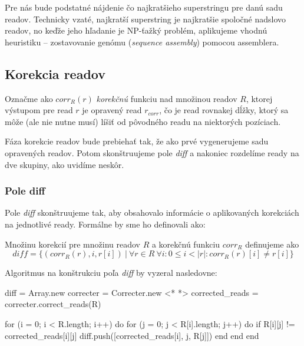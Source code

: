 Pre nás bude podstatné nájdenie čo najkratšieho superstringu pre danú sadu readov. Technicky vzaté, najkratší superstring je najkratšie spoločné nadslovo readov, no keďže jeho hľadanie je NP-ťažký problém, aplikujeme vhodnú heuristiku -- zostavovanie genómu (\emph{sequence assembly}) pomocou assemblera.

\subsection{Korekcia readov}
\begin{ozn}
Označme ako $corr_R(r)$ \emph{korekčnú} funkciu nad množinou readov $R$, ktorej výstupom pre read $r$ je opravený read $r_{corr}$, čo je read rovnakej dĺžky, ktorý sa môže (ale nie nutne musí) líšiť od pôvodného readu na niektorých pozíciach.
\end{ozn}

Fáza korekcie readov bude prebiehať tak, že ako prvé vygenerujeme sadu opravených readov. Potom skonštruujeme pole \emph{diff} a nakoniec rozdelíme ready na dve skupiny, ako uvidíme neskôr.

\subsubsection{Pole diff}
Pole \emph{diff} skonštruujeme tak, aby obsahovalo informácie o aplikovaných korekciách na jednotlivé ready. Formálne by sme ho definovali ako:

\begin{defn}
Množinu korekcií pre množinu readov $R$ a korekčnú funkciu $corr_R$ definujeme ako 
$$
diff = \{(corr_R(r), i, r[i])~|~\forall r \in R~\forall i : 0 \leq i < |r| : corr_R(r)[i] \neq r[i] \}
$$
\end{defn}

Algoritmus na konštrukciu poľa \emph{diff} by vyzeral nasledovne:

\bigskip
\begin{pseudocode}[label=lst:cr_index_diff_construction,caption={Algoritmus konštrukcie poľa diff.}]
diff = Array.new
correcter = Correcter.new <* \label{lst:cr_index_diff_construction_correcter} *>
corrected_reads = correcter.correct_reads(R)

for (i = 0; i < R.length; i++) do
  for (j = 0; j < R[i].length; j++) do
    if R[i][j] != corrected_reads[i][j]
      diff.push([corrected_reads[i], j, R[j]])
    end  
  end
end
\end{pseudocode}
\bigskip

